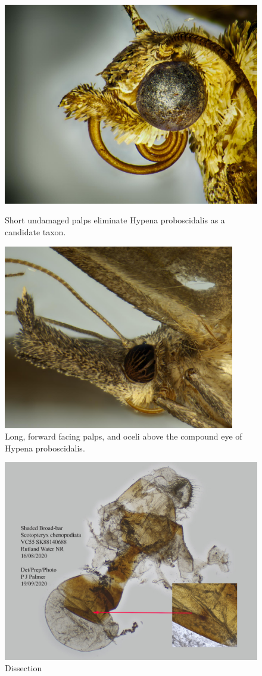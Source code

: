 \documentclass[]{article}
\begin{document}
\begin{figure}
	\centering
	\begin{minipage}{0.45\textwidth}
		\centering
	\includegraphics[width=0.5\linewidth]{20201112-1}
	\caption{Short undamaged palps eliminate Hypena proboscidalis as a candidate taxon.}
	\label{fig:20201112-1}
	\end{minipage}\hfill
	\begin{minipage}{0.45\textwidth}
		\centering
		\includegraphics[width=0.9\textwidth]{S202012271446-4} %
		\caption{Long, forward facing palps, and oceli above the compound eye of Hypena proboscidalis.}
		\label{fig:S202012271446-4}
	\end{minipage}
\end{figure}

\begin{figure}
	\centering
	\includegraphics[width=0.7\linewidth]{202009131026PJP-3}
	\caption{Dissection}
	\label{fig:202009131026pjp-3}
\end{figure}


%



\end{document}

